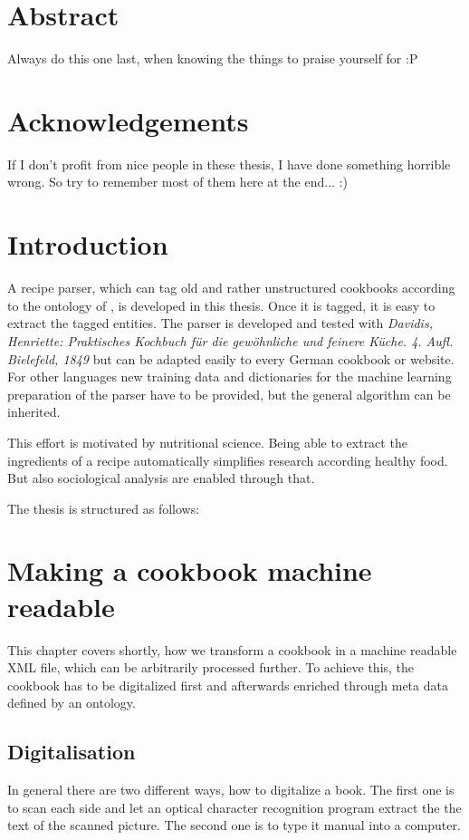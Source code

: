 \documentclass[12pt, twoside]{report}
\begin{document}
\chapter*{Abstract}
Always do this one last, when knowing the things to praise  yourself for :P

\chapter*{Acknowledgements}
If I don't profit from nice people in these thesis, I have done something horrible wrong. So try to remember most of them here at the end... :)

\tableofcontents

\listoffigures
\listoftables
\lstlistoflistings

\clearpage
{}  
\chapter{Introduction}
A recipe parser, which can tag old and rather unstructured cookbooks according to the ontology of \parencite{schemaRecipe}, is developed in this thesis. Once it is tagged, it is easy to extract the tagged entities. The parser is developed and tested with \textit{Davidis, Henriette: Praktisches Kochbuch für die gewöhnliche und feinere Küche. 4. Aufl. Bielefeld, 1849} but can be adapted easily to every German cookbook or website. For other languages new training data and dictionaries for the machine learning preparation of the parser have to be provided, but the general algorithm can be inherited.

This effort is motivated by nutritional science. Being able to extract the ingredients of a recipe automatically simplifies research according healthy food. But also sociological analysis are enabled through that.

The thesis is structured as follows:


\chapter{Making a cookbook machine readable}
This chapter covers shortly, how we transform a cookbook in a machine readable XML file, which can be arbitrarily processed further. To achieve this, the cookbook has to be digitalized first and afterwards enriched through meta data defined by an ontology.

\section{Digitalisation}
In general there are two different ways, how to digitalize a book. The first one is to scan each side and let an optical character recognition program extract the the text of the scanned picture. The second one is to type it manual into a computer.
\end{document}
